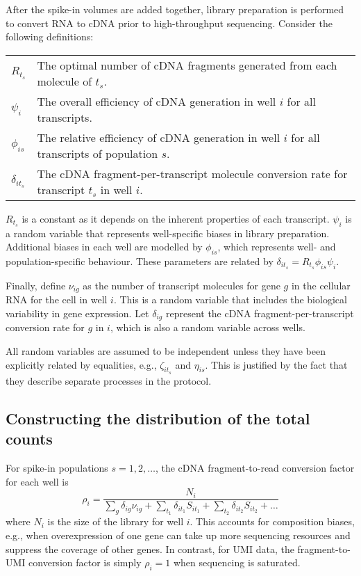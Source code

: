 \documentclass{article}
\begin{document}
After the spike-in volumes are added together, library preparation is performed to convert RNA to cDNA prior to high-throughput sequencing.
Consider the following definitions:
\begin{center}
\begin{tabular}{l p{}}
$R_{t_s}$ & The optimal number of cDNA fragments generated from each molecule of $t_s$. \\
$\psi_{i}$ & The overall efficiency of cDNA generation in well $i$ for all transcripts. \\
$\phi_{is}$ & The relative efficiency of cDNA generation in well $i$ for all transcripts of population $s$. \\
$\delta_{it_s}$ & The cDNA fragment-per-transcript molecule conversion rate for transcript $t_s$ in well $i$.
\end{tabular}
\end{center}
$R_{t_s}$ is a constant as it depends on the inherent properties of each transcript.
$\psi_{i}$ is a random variable that represents well-specific biases in library preparation.
Additional biases in each well are modelled by $\phi_{is}$, which represents well- and population-specific behaviour.
These parameters are related by $\delta_{it_s} = R_{t_s} \phi_{is} \psi_i$.

Finally, define $\nu_{ig}$ as the number of transcript molecules for gene $g$ in the cellular RNA for the cell in well $i$.
This is a random variable that includes the biological variability in gene expression.
Let $\delta_{ig}$ represent the cDNA fragment-per-transcript conversion rate for $g$ in $i$, which is also a random variable across wells.

All random variables are assumed to be independent unless they have been explicitly related by equalities, e.g., $\zeta_{it_s}$ and $\eta_{is}$.
This is justified by the fact that they describe separate processes in the protocol.

\subsection{Constructing the distribution of the total counts}
For spike-in populations $s=1, 2, \ldots$, the cDNA fragment-to-read conversion factor for each well is
\[
    \rho_i = \frac{N_i}{\sum_g \delta_{ig}\nu_{ig} + \sum_{t_1} \delta_{it_1} S_{it_1}  + \sum_{t_2} \delta_{it_2} S_{it_2} + \ldots} 
\]
where $N_i$ is the size of the library for well $i$.
This accounts for composition biases, e.g., when overexpression of one gene can take up more sequencing resources and suppress the coverage of other genes.
In contrast, for UMI data, the fragment-to-UMI conversion factor is simply $\rho_i = 1$ when sequencing is saturated.
\end{document}
